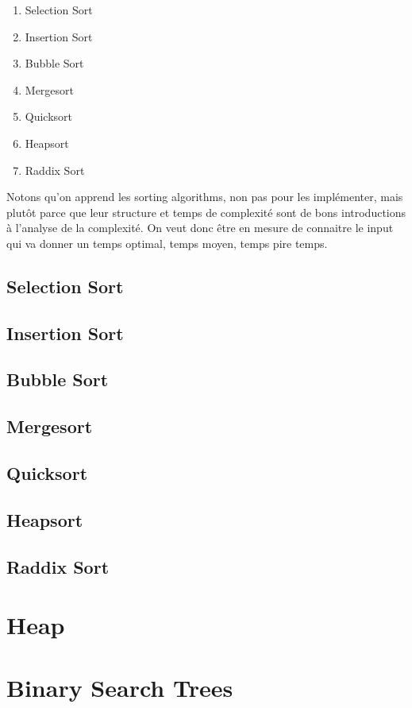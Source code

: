 \documentclass{article}
\begin{document}
\begin{enumerate}
    \item Selection Sort
    \item Insertion Sort
    \item Bubble Sort
    \item Mergesort
    \item Quicksort
    \item Heapsort
    \item Raddix Sort
\end{enumerate}

Notons qu'on apprend les sorting algorithms, non pas pour les implémenter,
mais plutôt parce que leur structure et temps de complexité sont de bons
introductions à l'analyse de la complexité. On veut donc être en mesure
de connaitre le input qui va donner un temps optimal, temps moyen, temps
pire temps.

\subsection{Selection Sort}
\subsection{Insertion Sort}
\subsection{Bubble Sort}
\subsection{Mergesort}
\subsection{Quicksort}
\subsection{Heapsort}
\subsection{Raddix Sort}

\section{Heap}

\section{Binary Search Trees}
\end{document}
